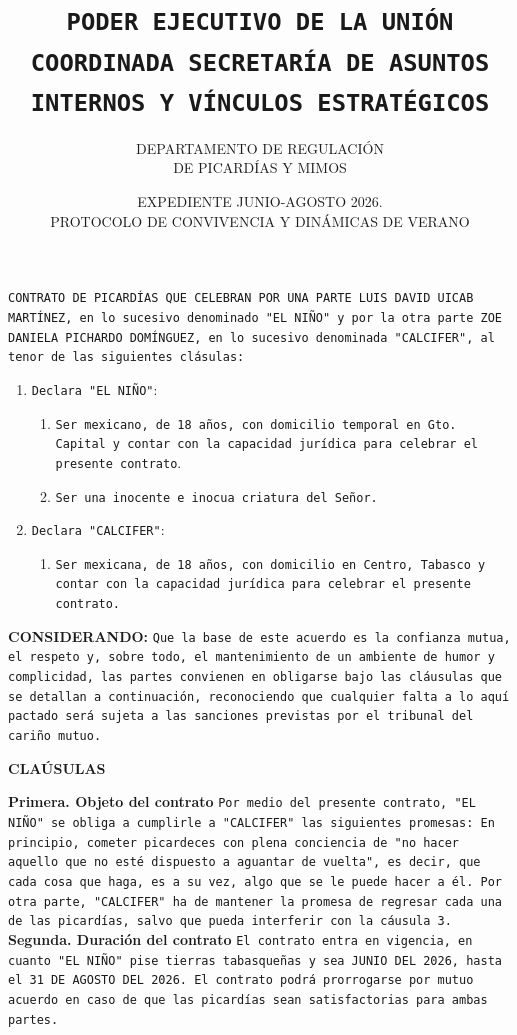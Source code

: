 \documentclass[11pt]{scrartcl}
\title{\texttt{PODER EJECUTIVO DE LA UNIÓN COORDINADA
SECRETARÍA DE ASUNTOS INTERNOS Y VÍNCULOS ESTRATÉGICOS}}
\author{DEPARTAMENTO DE REGULACIÓN\\
DE PICARDÍAS Y MIMOS}
\date{EXPEDIENTE JUNIO-AGOSTO 2026. \\
PROTOCOLO DE CONVIVENCIA Y DINÁMICAS DE VERANO}
\begin{document}
\maketitle
\texttt{CONTRATO DE PICARDÍAS QUE CELEBRAN POR UNA PARTE LUIS DAVID UICAB MARTÍNEZ, en lo sucesivo denominado "EL NIÑO" y por la otra parte
ZOE DANIELA PICHARDO DOMÍNGUEZ, en lo sucesivo denominada "CALCIFER", al tenor de las siguientes clásulas:}
\begin{enumerate}[I]
    \item \texttt{Declara "EL NIÑO"}:
    \begin{enumerate}
        \item \texttt{Ser mexicano, de 18 años, con domicilio temporal en Gto. Capital y contar con la capacidad jurídica para celebrar el presente
        contrato}.
        \item \texttt{Ser una inocente e inocua criatura del Señor.}
    \end{enumerate}
    \item \texttt{Declara "CALCIFER"}:
    \begin{enumerate}
        \item \texttt{Ser mexicana, de 18 años, con domicilio en Centro, Tabasco y contar con la capacidad jurídica para celebrar el presente
        contrato.}
    \end{enumerate}
\end{enumerate}
\textbf{CONSIDERANDO:} \texttt{Que la base de este acuerdo es la confianza mutua, el respeto y, sobre todo, el mantenimiento de un ambiente de humor y complicidad,
las partes convienen en obligarse bajo las cláusulas que se detallan a continuación, reconociendo que cualquier falta a lo aquí pactado será sujeta a las sanciones previstas por el tribunal del cariño mutuo.}
\begin{center}
    \textbf{CLAÚSULAS}
\end{center}
\textbf{Primera. Objeto del contrato} \texttt{Por medio del presente contrato, "EL NIÑO" se obliga a cumplirle a "CALCIFER" las siguientes promesas: En principio,
cometer picardeces con plena conciencia de "no hacer aquello que no esté dispuesto a aguantar de vuelta", es decir, que cada cosa que haga, es a su vez, algo que se 
le puede hacer a él. Por otra parte, "CALCIFER" ha de mantener la promesa de regresar cada una de las picardías, salvo que pueda interferir con la cáusula 3.} \\
\textbf{Segunda. Duración del contrato} \texttt{El contrato entra en vigencia, en cuanto "EL NIÑO" pise tierras tabasqueñas y sea JUNIO DEL 2026, hasta el 31 DE AGOSTO DEL 2026. El contrato
podrá prorrogarse por mutuo acuerdo en caso de que las picardías sean satisfactorias para ambas partes.} \\
\end{document}
